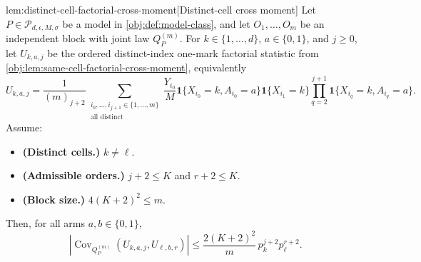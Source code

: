 \documentclass[11pt]{article}
\begin{document}
\begin{lemmav}{lem:distinct-cell-factorial-cross-moment}[Distinct-cell cross moment]
Let \(P\in\mathcal P_{d,\epsilon,M,\sigma}\) be a model in \cref{obj:def:model-class}, and let \(O_1,\ldots,O_m\) be an independent block with joint law \(Q_P^{(m)}\).  For \(k\in\{1,\ldots,d\}\), \(a\in\{0,1\}\), and \(j\ge 0\), let \(U_{k,a,j}\) be the ordered distinct-index one-mark factorial statistic from \cref{obj:lem:same-cell-factorial-cross-moment}, equivalently
\[
U_{k,a,j}
=
\frac{1}{(m)_{j+2}}
\sum_{\substack{i_0,\ldots,i_{j+1}\in\{1,\ldots,m\}\\ \text{all distinct}}}
\frac{Y_{i_0}}{M}
\mathbf 1\{X_{i_0}=k,A_{i_0}=a\}
\mathbf 1\{X_{i_1}=k\}
\prod_{q=2}^{j+1}\mathbf 1\{X_{i_q}=k,A_{i_q}=a\}.
\]
Assume:
\begin{itemize}
\item \textbf{(Distinct cells.)} \(k\ne \ell\).
\item \textbf{(Admissible orders.)} \(j+2\le K\) and \(r+2\le K\).
\item \textbf{(Block size.)} \(4(K+2)^2\le m\).
\end{itemize}
Then, for all arms \(a,b\in\{0,1\}\),
\[
\left|
\operatorname{Cov}_{Q_P^{(m)}}\!\left(U_{k,a,j},U_{\ell,b,r}\right)
\right|
\le
\frac{2(K+2)^2}{m}\,
p_k^{j+2}p_{\ell}^{r+2}.
\]
\end{lemmav}
\end{document}
